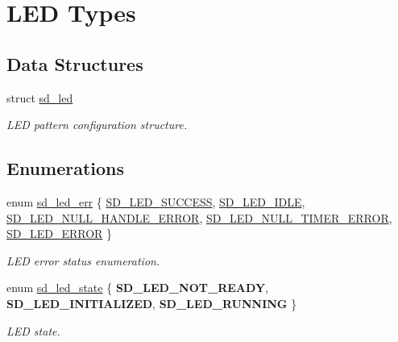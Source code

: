 \hypertarget{group___s_d___l_e_d___types}{}\section{L\+ED Types}
\label{group___s_d___l_e_d___types}
\subsection*{Data Structures}
\begin{DoxyCompactItemize}
\item 
struct \mbox{\hyperlink{structsd__led}{sd\+\_\+led}}
\begin{DoxyCompactList}\small\item\em L\+ED pattern configuration structure. \end{DoxyCompactList}\end{DoxyCompactItemize}
\subsection*{Enumerations}
\begin{DoxyCompactItemize}
\item 
enum \mbox{\hyperlink{group___s_d___l_e_d___types_ga4f347a1003b4089de88a7f0fc62c1071}{sd\+\_\+led\+\_\+err}} \{ \newline
\mbox{\hyperlink{group___s_d___l_e_d___types_gga4f347a1003b4089de88a7f0fc62c1071ad3d9e41d4cdb2e47e8754d0a1a3824e2}{S\+D\+\_\+\+L\+E\+D\+\_\+\+S\+U\+C\+C\+E\+SS}}, 
\mbox{\hyperlink{group___s_d___l_e_d___types_gga4f347a1003b4089de88a7f0fc62c1071a6c91349c49b8ebeb399bfb6709d82e7d}{S\+D\+\_\+\+L\+E\+D\+\_\+\+I\+D\+LE}}, 
\mbox{\hyperlink{group___s_d___l_e_d___types_gga4f347a1003b4089de88a7f0fc62c1071ac90640745bacb0ff9863a4d917ae02a1}{S\+D\+\_\+\+L\+E\+D\+\_\+\+N\+U\+L\+L\+\_\+\+H\+A\+N\+D\+L\+E\+\_\+\+E\+R\+R\+OR}}, 
\mbox{\hyperlink{group___s_d___l_e_d___types_gga4f347a1003b4089de88a7f0fc62c1071afc7e0672820a686720c50ff0aa9d807a}{S\+D\+\_\+\+L\+E\+D\+\_\+\+N\+U\+L\+L\+\_\+\+T\+I\+M\+E\+R\+\_\+\+E\+R\+R\+OR}}, 
\newline
\mbox{\hyperlink{group___s_d___l_e_d___types_gga4f347a1003b4089de88a7f0fc62c1071a7bf9f82fdd1432363c2f9bce8321d2c2}{S\+D\+\_\+\+L\+E\+D\+\_\+\+E\+R\+R\+OR}}
 \}
\begin{DoxyCompactList}\small\item\em L\+ED error status enumeration. \end{DoxyCompactList}\item 
\mbox{\label{group___s_d___l_e_d___types_ga7daede63a3984f10471c8eb658e936e3}} 
enum \mbox{\hyperlink{group___s_d___l_e_d___types_ga7daede63a3984f10471c8eb658e936e3}{sd\+\_\+led\+\_\+state}} \{ {\bfseries S\+D\+\_\+\+L\+E\+D\+\_\+\+N\+O\+T\+\_\+\+R\+E\+A\+DY}, 
{\bfseries S\+D\+\_\+\+L\+E\+D\+\_\+\+I\+N\+I\+T\+I\+A\+L\+I\+Z\+ED}, 
{\bfseries S\+D\+\_\+\+L\+E\+D\+\_\+\+R\+U\+N\+N\+I\+NG}
 \}
\begin{DoxyCompactList}\small\item\em L\+ED state. \end{DoxyCompactList}\end{DoxyCompactItemize}


